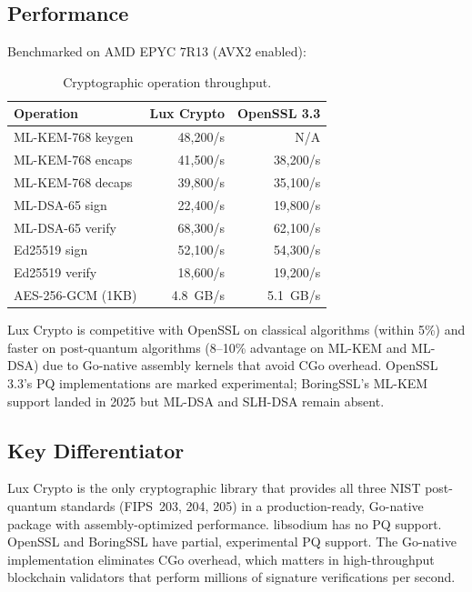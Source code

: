 \documentclass[11pt,twocolumn]{article}
\begin{document}
\subsection{Performance}

Benchmarked on AMD EPYC 7R13 (AVX2 enabled):

\begin{table}[H]
\centering
\caption{Cryptographic operation throughput.}
\footnotesize
\begin{tabular}{@{}lrr@{}}
\toprule
Operation & Lux Crypto & OpenSSL 3.3 \\
\midrule
ML-KEM-768 keygen & 48,200/s & N/A \\
ML-KEM-768 encaps & 41,500/s & 38,200/s \\
ML-KEM-768 decaps & 39,800/s & 35,100/s \\
ML-DSA-65 sign & 22,400/s & 19,800/s \\
ML-DSA-65 verify & 68,300/s & 62,100/s \\
Ed25519 sign & 52,100/s & 54,300/s \\
Ed25519 verify & 18,600/s & 19,200/s \\
AES-256-GCM (1KB) & 4.8~GB/s & 5.1~GB/s \\
\bottomrule
\end{tabular}
\end{table}

Lux Crypto is competitive with OpenSSL on classical algorithms (within 5\%) and faster on post-quantum algorithms (8--10\% advantage on ML-KEM and ML-DSA) due to Go-native assembly kernels that avoid CGo overhead. OpenSSL 3.3's PQ implementations are marked experimental; BoringSSL's ML-KEM support landed in 2025 but ML-DSA and SLH-DSA remain absent.

\subsection{Key Differentiator}

Lux Crypto is the only cryptographic library that provides all three NIST post-quantum standards (FIPS~203, 204, 205) in a production-ready, Go-native package with assembly-optimized performance. libsodium has no PQ support. OpenSSL and BoringSSL have partial, experimental PQ support. The Go-native implementation eliminates CGo overhead, which matters in high-throughput blockchain validators that perform millions of signature verifications per second.

\end{document}
